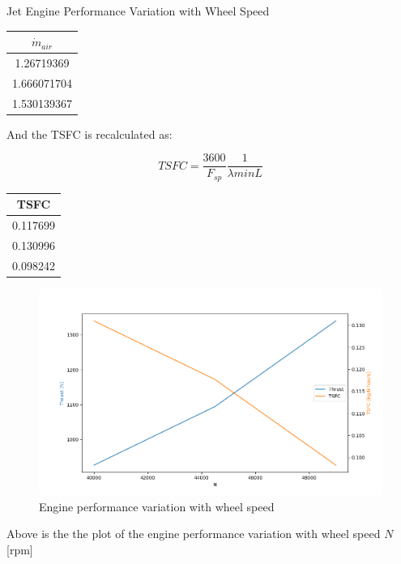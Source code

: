 \documentclass[titlepage]{article}
\begin{document}
\begin{section}{Jet Engine Performance Variation with Wheel Speed}
\begin{center}
  \begin{tabular}{|c|}
    \hline
    $\dot{m}_{air}$ \\
    \hline
    1.26719369 \\
    \hline
    1.666071704 \\
    \hline
    1.530139367 \\
    \hline
  \end{tabular}
\end{center}

And the TSFC is recalculated as:

\begin{equation}
  TSFC = \frac{3600}{F_{sp}} \frac{1}{\lambda minL}
\end{equation}

\begin{center}
  \begin{tabular}{|c|}
    \hline
    TSFC \\
    \hline
    0.117699 \\
    \hline
    0.130996 \\
    \hline
    0.098242 \\
    \hline
  \end{tabular}
\end{center}

\begin{figure}[h]
  \centering
  \includegraphics[width=\textwidth]{fig_N.png}
  \caption{Engine performance variation with wheel speed}
  \label{fig:WheelSpeedVar}
\end{figure}

\vspace{7cm}

Above is the the plot of the engine performance variation with wheel speed $N$ [rpm]

\end{section}
\end{document}
